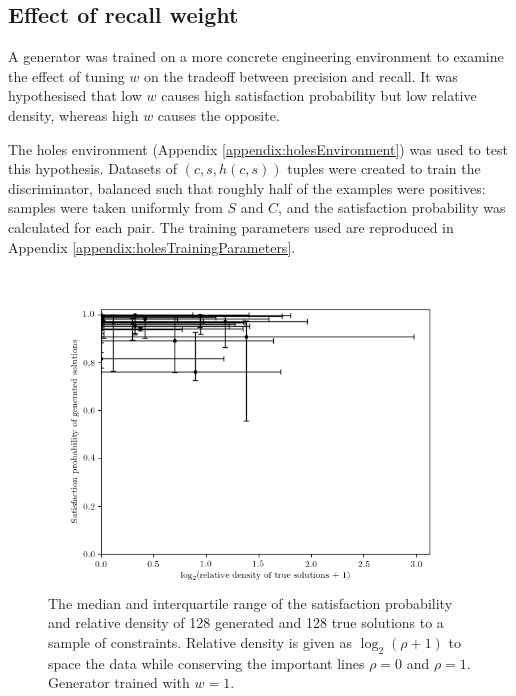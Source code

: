 \documentclass[../../main.tex]{subfiles}
\begin{document}
\subsection{Effect of recall weight} \label{subsection:effectOfRecallWeight}

A generator was trained on a more concrete engineering environment to examine the effect of tuning $w$ on the tradeoff between precision and recall.
It was hypothesised that low $w$ causes high satisfaction probability but low relative density, whereas high $w$ causes the opposite.

The holes environment (Appendix \ref{appendix:holesEnvironment}) was used to test this hypothesis.
Datasets of $(c,s,h(c,s))$ tuples were created to train the discriminator, balanced such that roughly half of the examples were positives: samples were taken uniformly from $S$ and $C$, and the satisfaction probability was calculated for each pair.
The training parameters used are reproduced in Appendix \ref{appendix:holesTrainingParameters}.
\begin{figure}[H]
    \begin{center}
    \includegraphics[width=\textwidth]{solutionPropertiesEvenlyWeighted}
    \caption[Satisfaction probability and relative density for low $w$]{
        The median and interquartile range of the satisfaction probability and relative density of 128 generated and 128 true solutions to a sample of constraints.
        Relative density is given as $\log_2(\rho+1)$ to space the data while conserving the important lines $\rho=0$ and $\rho=1$.
        Generator trained with $w=1$.
    }
    \label{fig:solutionPropertiesEvenlyWeighted}
    \end{center}
\end{figure}
\end{document}
